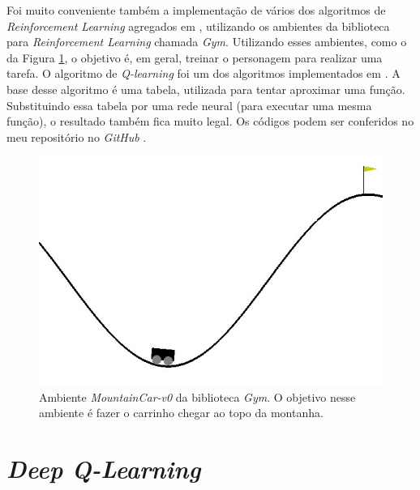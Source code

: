 \documentclass{article}
\begin{document}
        Foi muito conveniente também a implementação de vários dos 
        algoritmos de \textit{Reinforcement Learning} agregados em
        , utilizando os ambientes da biblioteca para \textit{Reinforcement Learning} chamada \textit{Gym}.
        Utilizando esses ambientes, como o da Figura \ref{fig:mountaincar-v0}, o objetivo é, em geral, treinar
        o personagem para realizar uma tarefa.
        O algoritmo de \textit{Q-learning} foi um dos algoritmos implementados em
        .
        A base desse algoritmo é uma tabela,
        utilizada para tentar aproximar uma função. Substituindo essa tabela por
        uma rede neural (para executar uma mesma função), o resultado também fica muito
        legal. Os códigos podem ser conferidos no meu repositório no \textit{GitHub}
        .

        \begin{figure}[h!]
            \centering
            \includegraphics[width=\textwidth]{mountaincar_v0.jpg}
            \caption{Ambiente \textit{MountainCar-v0} da biblioteca \textit{Gym}.
            O objetivo nesse ambiente é fazer o carrinho chegar ao topo da montanha.}
            \label{fig:mountaincar-v0}
        \end{figure}

    \section{\textit{Deep Q-Learning}}
\end{document}
